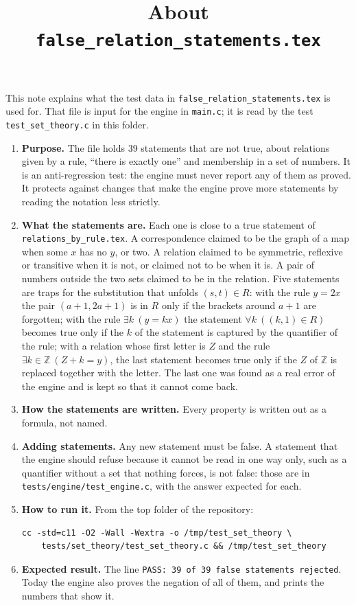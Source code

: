 \documentclass[11pt,a4paper]{article}
\title{About \texttt{false\_relation\_statements.tex}}
\author{}
\date{}
\begin{document}
\maketitle
This note explains what the test data in \texttt{false\_relation\_statements.tex} is used for. That file is input for the engine in \texttt{main.c}; it is read by the test \texttt{test\_set\_theory.c} in this folder.

\begin{enumerate}
\item \textbf{Purpose.} The file holds 39 statements that are not true, about relations given by a rule, ``there is exactly one'' and membership in a set of numbers. It is an anti-regression test: the engine must never report any of them as proved. It protects against changes that make the engine prove more statements by reading the notation less strictly.

\item \textbf{What the statements are.} Each one is close to a true statement of \texttt{relations\_by\_rule.tex}. A correspondence claimed to be the graph of a map when some $x$ has no $y$, or two. A relation claimed to be symmetric, reflexive or transitive when it is not, or claimed not to be when it is. A pair of numbers outside the two sets claimed to be in the relation. Five statements are traps for the substitution that unfolds $(s, t) \in R$: with the rule $y = 2x$ the pair $(a + 1, 2a + 1)$ is in $R$ only if the brackets around $a + 1$ are forgotten; with the rule $\exists k\ (y = kx)$ the statement $\forall k\ ((k, 1) \in R)$ becomes true only if the $k$ of the statement is captured by the quantifier of the rule; with a relation whose first letter is $Z$ and the rule $\exists k \in \mathbb{Z}\ (Z + k = y)$, the last statement becomes true only if the $Z$ of $\mathbb{Z}$ is replaced together with the letter. The last one was found as a real error of the engine and is kept so that it cannot come back.

\item \textbf{How the statements are written.} Every property is written out as a formula, not named.

\item \textbf{Adding statements.} Any new statement must be false. A statement that the engine should refuse because it cannot be read in one way only, such as a quantifier without a set that nothing forces, is not false: those are in \texttt{tests/engine/test\_engine.c}, with the answer expected for each.

\item \textbf{How to run it.} From the top folder of the repository:
\begin{verbatim}
cc -std=c11 -O2 -Wall -Wextra -o /tmp/test_set_theory \
    tests/set_theory/test_set_theory.c && /tmp/test_set_theory
\end{verbatim}

\item \textbf{Expected result.} The line \texttt{PASS: 39 of 39 false statements rejected}. Today the engine also proves the negation of all of them, and prints the numbers that show it.
\end{enumerate}
\end{document}
